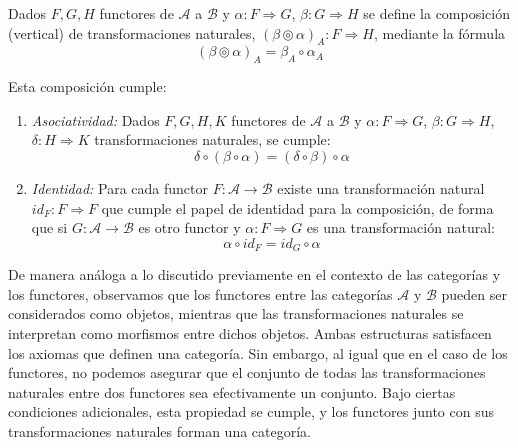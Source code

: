 

\begin{definicion}
        Dados $F,G,H$ functores de $\mathscr{A}$ a $\mathscr{B}$ y $\alpha: F \Rightarrow G$, $\beta: G \Rightarrow H$ se define la composición (vertical) de transformaciones naturales, $(\beta \circledcirc \alpha)_{A}: F \Rightarrow H$, mediante la fórmula \begin{equation}
        (\beta \circledcirc \alpha)_{A} = \beta_{A} \circ \alpha_{A}
    \end{equation}
    
    Esta composición cumple:
    
    \begin{enumerate}
        \item \textit{Asociatividad: } Dados $F,G,H, K$ functores de $\mathscr{A}$ a $\mathscr{B}$ y $\alpha: F \Rightarrow G$, $\beta: G \Rightarrow H$, $\delta: H \Rightarrow K$ transformaciones naturales, se cumple: \begin{equation}
            \delta \circ (\beta \circ \alpha) = (\delta \circ \beta) \circ \alpha
        \end{equation} 
        \item \textit{Identidad: }  Para cada functor $F: \mathscr{A} \longrightarrow \mathscr{B}$ existe una transformación natural $id_{F}: F \Rightarrow F$ que cumple el papel de identidad para la composición, de forma que si $G: \mathscr{A} \longrightarrow \mathscr{B}$ es otro functor y $\alpha: F \Rightarrow G$ es una transformación natural: \begin{equation}
            \alpha \circ id_{F} = id_{G} \circ \alpha
        \end{equation}
    \end{enumerate}
\end{definicion}

De manera análoga a lo discutido previamente en el contexto de las categorías y los functores, observamos que los functores entre las categorías $\mathscr{A}$ y $\mathscr{B}$ pueden ser considerados como objetos, mientras que las transformaciones naturales se interpretan como morfismos entre dichos objetos. Ambas estructuras satisfacen los axiomas que definen una categoría. Sin embargo, al igual que en el caso de los functores, no podemos asegurar que el conjunto de todas las transformaciones naturales entre dos functores sea efectivamente un conjunto. Bajo ciertas condiciones adicionales, esta propiedad se cumple, y los functores junto con sus transformaciones naturales forman una categoría.

